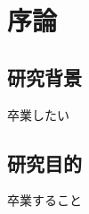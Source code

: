 ﻿\chapter{序論}
\thispagestyle{fancy} %

\section{研究背景}
卒業したい \cite{masterthesis}

\section{研究目的}
卒業すること